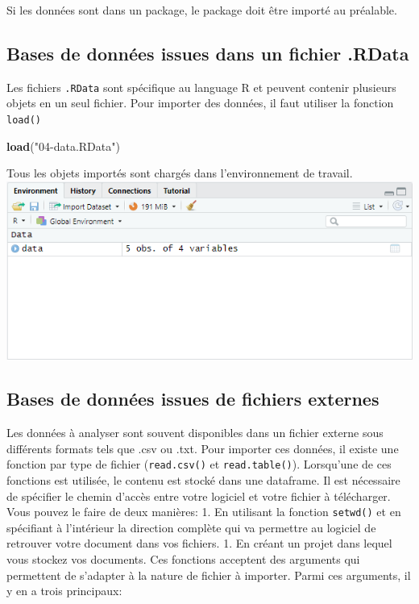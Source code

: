 \documentclass[
]{book}
\newenvironment{Shaded}{\begin{snugshade}}{\end{snugshade}}
\newcommand{\FunctionTok}[1]{\textcolor[rgb]{0.13,0.29,0.53}{\textbf{#1}}}
\newcommand{\NormalTok}[1]{#1}
\newcommand{\StringTok}[1]{\textcolor[rgb]{0.31,0.60,0.02}{#1}}
\begin{document}
Si les données sont dans un package, le package doit être importé au préalable.

\subsection{Bases de données issues dans un fichier .RData}\label{bases-de-donnuxe9es-issues-dans-un-fichier-.rdata}

Les fichiers \texttt{.RData} sont spécifique au language R et peuvent contenir plusieurs objets en un seul fichier. Pour importer des données, il faut utiliser la fonction \texttt{load()}

\begin{Shaded}
\begin{Highlighting}[]
\FunctionTok{load}\NormalTok{(}\StringTok{"04{-}data.RData"}\NormalTok{)}
\end{Highlighting}
\end{Shaded}

Tous les objets importés sont chargés dans l'environnement de travail.
\includegraphics{images/environment_forRDataDownload.png}

\subsection{Bases de données issues de fichiers externes}\label{bases-de-donnuxe9es-issues-de-fichiers-externes}

Les données à analyser sont souvent disponibles dans un fichier externe sous différents formats tels que .csv ou .txt. Pour importer ces données, il existe une fonction par type de fichier (\texttt{read.csv()} et \texttt{read.table()}). Lorsqu'une de ces fonctions est utilisée, le contenu est stocké dans une dataframe. Il est nécessaire de spécifier le chemin d'accès entre votre logiciel et votre fichier à télécharger. Vous pouvez le faire de deux manières:
1. En utilisant la fonction \texttt{setwd()} et en spécifiant à l'intérieur la direction complète qui va permettre au logiciel de retrouver votre document dans vos fichiers.
1. En créant un projet dans lequel vous stockez vos documents.
Ces fonctions acceptent des arguments qui permettent de s'adapter à la nature de fichier à importer. Parmi ces arguments, il y en a trois principaux:
\end{document}
